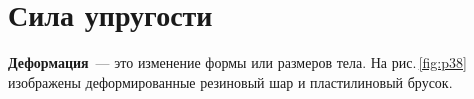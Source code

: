 \documentclass[main.tex]{subfiles}
\begin{document}



 

 

\setcounter{section}{20
}
\addtocounter{section}{-1} 

\section{Сила упругости}

\textbf{Деформация}~--- это изменение формы или размеров тела. На рис.\,\ref{fig:p38} изображены деформированные резиновый шар и пластилиновый брусок.
\end{document}
